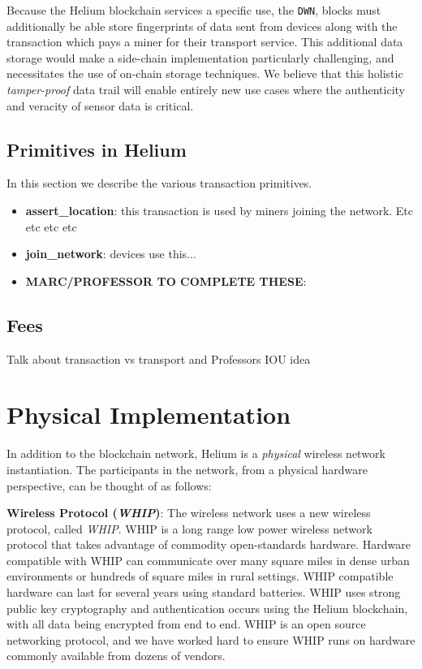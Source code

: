 \documentclass[letterpaper,11pt]{article}
\begin{document}
Because the Helium blockchain services a specific use, the \verb|DWN|, blocks must additionally be able store fingerprints of data sent from devices along with the transaction which pays a miner for their transport service. This additional data storage would make a side-chain implementation particularly challenging, and necessitates the use of on-chain storage techniques. We believe that this holistic \emph{tamper-proof} data trail will enable entirely new use cases where the authenticity and veracity of sensor data is critical.

\subsection{Primitives in Helium}

In this section we describe the various transaction primitives.

\begin{itemize}
  \item \textbf{assert\_location}: this transaction is used by miners joining the network. Etc etc etc etc
  \item \textbf{join\_network}: devices use this...
  \item \textbf{MARC/PROFESSOR TO COMPLETE THESE}:
\end{itemize}

\subsection{Fees}

Talk about transaction vs transport and Professors IOU idea

\newpage

\section{Physical Implementation}

In addition to the blockchain network, Helium is a \emph{physical} wireless network instantiation. The participants in the network, from a physical hardware perspective, can be thought of as follows:\newline

\textbf{Wireless Protocol (\emph{WHIP})}: The wireless network uses a new wireless protocol, called \emph{WHIP}. WHIP is a long range low power wireless network protocol that takes advantage of commodity open-standards hardware. Hardware compatible with WHIP can communicate over many square miles in dense urban environments or hundreds of square miles in rural settings. WHIP compatible hardware can last for several years using standard batteries. WHIP uses strong public key cryptography and authentication occurs using the Helium blockchain, with all data being encrypted from end to end. WHIP is an open source networking protocol, and we have worked hard to ensure WHIP runs on hardware commonly available from dozens of vendors.\newline
\end{document}
